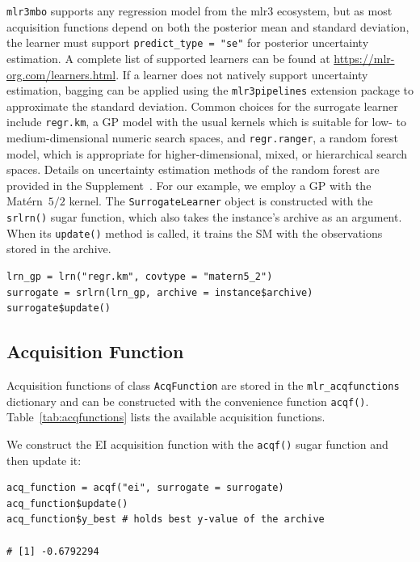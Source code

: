 \documentclass[12pt,letterpaper]{article}
\begin{document}
\texttt{mlr3mbo} supports any regression model from the mlr3 ecosystem, but as most acquisition functions depend on both the posterior mean and standard deviation, the learner must support \texttt{predict\_type = "se"} for posterior uncertainty estimation.
A complete list of supported learners can be found at \url{https://mlr-org.com/learners.html}.
If a learner does not natively support uncertainty estimation, bagging can be applied using the \texttt{mlr3pipelines}\cite{binder2021}  extension package to approximate the standard deviation.
Common choices for the surrogate learner include \texttt{regr.km}\cite{roustant2012}, a GP model with the usual kernels which is suitable for low- to medium-dimensional numeric search spaces, and \texttt{regr.ranger}\cite{wright2017}, a random forest model, which is appropriate for higher-dimensional, mixed, or hierarchical search spaces. 
Details on uncertainty estimation methods of the random forest are provided in the Supplement~.
For our example, we employ a GP with the Matérn~$5/2$ kernel.
The \texttt{SurrogateLearner} object is constructed with the \texttt{srlrn()} sugar function, which also takes the instance's archive as an argument.
When its \texttt{update()} method is called, it trains the SM with the observations stored in the archive.


\begin{verbatim}
lrn_gp = lrn("regr.km", covtype = "matern5_2")
surrogate = srlrn(lrn_gp, archive = instance$archive)
surrogate$update()
\end{verbatim}

\subsection*{Acquisition Function}

Acquisition functions of class \texttt{AcqFunction} are stored in the \texttt{mlr\_acqfunctions} dictionary and can be constructed with the convenience function \texttt{acqf()}.
Table~\ref{tab:acqfunctions} lists the available acquisition functions.


We construct the EI acquisition function with the \texttt{acqf()} sugar function and then update it: 

\begin{verbatim}
acq_function = acqf("ei", surrogate = surrogate)
acq_function$update()
acq_function$y_best # holds best y-value of the archive

# [1] -0.6792294
\end{verbatim}
\end{document}
